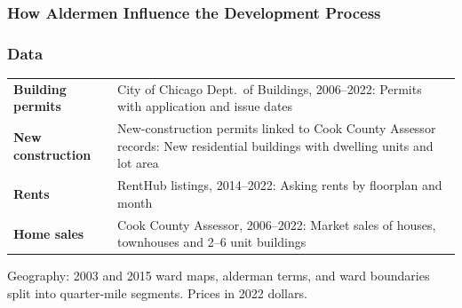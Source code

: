 
\begin{frame}[label=permits-pipeline]
   \frametitle{How Aldermen Influence the Development Process}
   \vspace{-0.3em}
   \centering
   \resizebox{\textwidth}{!}{}
\end{frame}

\begin{frame}[label=data-main]
    \frametitle{Data}
    \small
    \renewcommand{\arraystretch}{1.6}
    \begin{tabular}{@{}>{\raggedright\arraybackslash}p{}>{\raggedright\arraybackslash}p{}@{}}
      \toprule
      \textbf{Building permits} & City of Chicago Dept.\ of Buildings, 2006--2022: Permits with application and issue dates \\
      \textbf{New construction} & New-construction permits linked to Cook County Assessor records: New residential buildings with dwelling units and lot area \\
      \textbf{Rents} & RentHub listings, 2014--2022: Asking rents by floorplan and month \\
      \textbf{Home sales} & Cook County Assessor, 2006--2022: Market sales of houses, townhouses and 2--6 unit buildings \\
      \bottomrule
    \end{tabular}
    \par\smallskip
    \footnotesize Geography: 2003 and 2015 ward maps, alderman terms, and ward boundaries split into quarter-mile segments. Prices in 2022 dollars.
    \par\smallskip\hfill\hyperlink{construction-data-appendix}{}
\end{frame}

